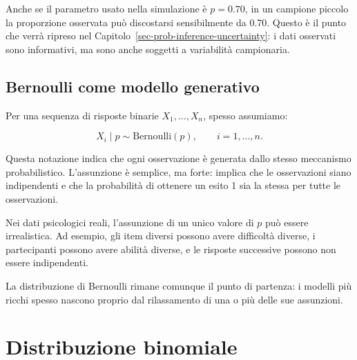 \documentclass[
  italian,
  letterpaper,
  a4paper,
  11pt,
  open=any]{scrbook}
\theoremstyle{plain}
\theoremstyle{definition}
\theoremstyle{definition}
\theoremstyle{remark}
\begin{document}
Anche se il parametro usato nella simulazione è \(p = 0.70\), in un
campione piccolo la proporzione osservata può discostarsi sensibilmente
da 0.70. Questo è il punto che verrà ripreso nel
Capitolo~\ref{sec-prob-inference-uncertainty}: i dati osservati sono
informativi, ma sono anche soggetti a variabilità campionaria.

\subsection{Bernoulli come modello
generativo}\label{bernoulli-come-modello-generativo}

Per una sequenza di risposte binarie \(X_1,\ldots,X_n\), spesso
assumiamo:

\[
X_i \mid p \sim \mathrm{Bernoulli}(p),
\qquad i=1,\ldots,n.
\]

Questa notazione indica che ogni osservazione è generata dallo stesso
meccanismo probabilistico. L'assunzione è semplice, ma forte: implica
che le osservazioni siano indipendenti e che la probabilità di ottenere
un esito 1 sia la stessa per tutte le osservazioni.

\begin{tcolorbox}[enhanced jigsaw, arc=.35mm, bottomrule=.15mm, bottomtitle=1mm, breakable, colback=white, colbacktitle=quarto-callout-warning-color!10!white, colframe=quarto-callout-warning-color-frame, coltitle=black, left=2mm, leftrule=.75mm, opacityback=0, opacitybacktitle=0.6, rightrule=.15mm, title=\textcolor{quarto-callout-warning-color}{\faExclamationTriangle}\hspace{0.5em}{Quando la Bernoulli e troppo semplice}, titlerule=0mm, toprule=.15mm, toptitle=1mm]

Nei dati psicologici reali, l'assunzione di un unico valore di \(p\) può
essere irrealistica. Ad esempio, gli item diversi possono avere
difficoltà diverse, i partecipanti possono avere abilità diverse, e le
risposte successive possono non essere indipendenti.

La distribuzione di Bernoulli rimane comunque il punto di partenza: i
modelli più ricchi spesso nascono proprio dal rilassamento di una o più
delle sue assunzioni.

\end{tcolorbox}

\section{Distribuzione binomiale}\label{sec-binomial-distribution}
\end{document}
